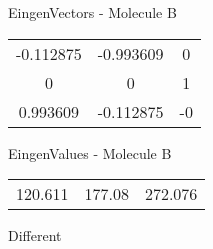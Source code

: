 \begin{multicols}{2}
\begin{center}
\vtab
 EingenVectors - Molecule B     \\
\vtab
\begin{tabular}{|c c c|}
-0.112875	 & 	-0.993609	 & 	0	 \\
0	 & 	0	 & 	1	 \\
0.993609	 & 	-0.112875	 & 	-0
\end{tabular}

\vtab
 EingenValues - Molecule B     \\
\vtab
\begin{tabular}{|c c c|}
120.611	 & 	177.08	 & 	272.076	 \\
\end{tabular}

\end{center}
\end{multicols}
\begin{center}
\vtab
\vtab
\textcolor{NavyBlue}{\Large Different}
\end{center}

 \newpage

